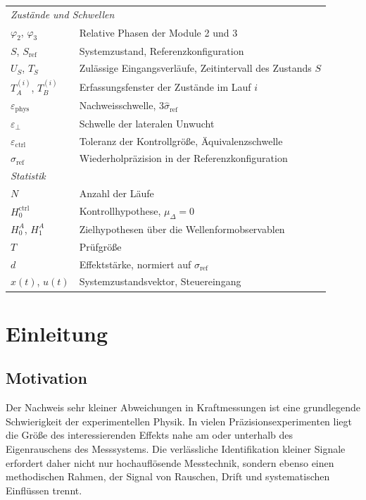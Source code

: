 \documentclass[12pt,a4paper]{report}
\begin{document}
\begin{longtable}{@{}p{}p{}@{}}
\multicolumn{2}{l}{\emph{Zustände und Schwellen}} \\
$\varphi_2$, $\varphi_3$ & Relative Phasen der Module 2 und 3 \\
$S$, $S_{\text{ref}}$ & Systemzustand, Referenzkonfiguration \\
$U_S$, $T_S$ & Zulässige Eingangsverläufe, Zeitintervall des Zustands $S$ \\
$T_A^{(i)}$, $T_B^{(i)}$ & Erfassungsfenster der Zustände im Lauf $i$ \\
$\varepsilon_{\text{phys}}$ & Nachweisschwelle, $3\hat{\sigma}_{\text{ref}}$ \\
$\varepsilon_{\perp}$ & Schwelle der lateralen Unwucht \\
$\varepsilon_{\text{ctrl}}$ & Toleranz der Kontrollgröße, Äquivalenzschwelle \\
$\hat{\sigma}_{\text{ref}}$ & Wiederholpräzision in der Referenzkonfiguration \\

\multicolumn{2}{l}{\emph{Statistik}} \\
$N$ & Anzahl der Läufe \\
$H_0^{\text{ctrl}}$ & Kontrollhypothese, $\mu_{\Delta}=0$ \\
$H_0^{A}$, $H_1^{A}$ & Zielhypothesen über die Wellenformobservablen \\
$T$ & Prüfgröße \\
$d$ & Effektstärke, normiert auf $\hat{\sigma}_{\text{ref}}$ \\
$x(t)$, $u(t)$ & Systemzustandsvektor, Steuereingang \\

\hline
\end{longtable}

\clearpage

\chapter{Einleitung}
\label{chap:einleitung}

\section{Motivation}

Der Nachweis sehr kleiner Abweichungen in Kraftmessungen ist eine
grundlegende Schwierigkeit der experimentellen Physik. In vielen
Präzisionsexperimenten liegt die Größe des interessierenden Effekts nahe
am oder unterhalb des Eigenrauschens des Messsystems. Die verlässliche
Identifikation kleiner Signale erfordert daher nicht nur hochauflösende
Messtechnik, sondern ebenso einen methodischen Rahmen, der Signal von
Rauschen, Drift und systematischen Einflüssen trennt.
\end{document}
